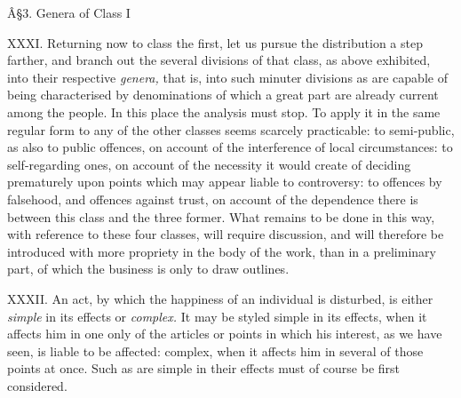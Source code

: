 \documentclass[12pt]{report}
\begin{document}
Â§3. Genera of Class I

XXXI. Returning now to class the first, let us pursue the distribution a
step farther, and branch out the several divisions of that class, as
above exhibited, into their respective \emph{genera,} that is, into such
minuter divisions as are capable of being characterised by denominations
of which a great part are already current among the people. In this
place the analysis must stop. To apply it in the same regular form to
any of the other classes seems scarcely practicable: to semi-public, as
also to public offences, on account of the interference of local
circumstances: to self-regarding ones, on account of the necessity it
would create of deciding prematurely upon points which may appear liable
to controversy: to offences by falsehood, and offences against trust, on
account of the dependence there is between this class and the three
former. What remains to be done in this way, with reference to these
four classes, will require discussion, and will therefore be introduced
with more propriety in the body of the work, than in a preliminary part,
of which the business is only to draw outlines.

XXXII. An act, by which the happiness of an individual is disturbed, is
either \emph{simple} in its effects or \emph{complex.} It may be styled
simple in its effects, when it affects him in one only of the articles
or points in which his interest, as we have seen, is liable to be
affected: complex, when it affects him in several of those points at
once. Such as are simple in their effects must of course be first
considered.
\end{document}
